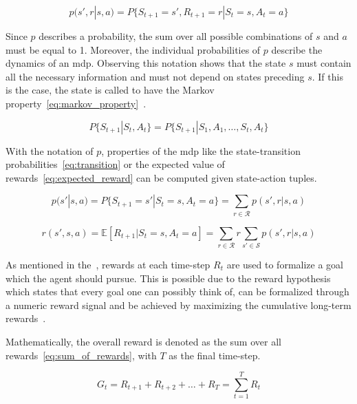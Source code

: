 \documentclass[draft,final]{vutinfth} %
\newcommand{\p}[1]{see p. #1}
\begin{document}
    \begin{equation}
        p(s',r|s,a) = P\{S_{t+1}=s', R_{t+1}=r | S_t=s, A_t=a\}\label{eq:distribution}
    \end{equation}

    Since $p$ describes a probability, the sum over all possible combinations of $s$ and $a$ must be equal to 1.
    Moreover, the individual probabilities of $p$ describe the dynamics of an \gls{mdp}.
    Observing this notation shows that the state $s$ must contain all the necessary information and must not depend on states preceding $s$.
    If this is the case, the state is called to have the Markov property~\eqref{eq:markov_property}~\citep{francois-lavet_introduction_2018}.

    \begin{equation}
        P\{S_{t+1}|S_t,A_t\} = P\{S_{t+1}|S_1,A_1,\ldots,S_t,A_t\} \label{eq:markov_property}
    \end{equation}

    With the notation of $p$, properties of the \gls{mdp} like the state-transition probabilities~\eqref{eq:transition} or the expected value of rewards~\eqref{eq:expected_reward} can be computed given state-action tuples.

    \begin{equation}
        p(s'|s,a) = P\{S_{t+1}=s'| S_t=s, A_t=a\} = \sum_{r \in \mathcal{R}} p(s',r | s,a) \label{eq:transition}
    \end{equation}

    \begin{equation}
        r(s',s,a) = \mathbb{E}[R_{t+1} | S_t=s, A_t=a] = \sum_{r\in \mathcal{R}} r \sum_{s' \in \mathcal{S}} p(s',r | s,a) \label{eq:expected_reward}
    \end{equation}

    As mentioned in the~, rewards at each time-step $R_t$ are used to formalize a goal which the agent should pursue.
    This is possible due to the reward hypothesis which states that every goal one can possibly think of, can be formalized through a numeric reward signal and be achieved by maximizing the cumulative long-term rewards~\citep[\p{53}]{sutton_reinforcement_2018}.

    Mathematically, the overall reward is denoted as the sum over all rewards~\eqref{eq:sum_of_rewards}, with $T$ as the final time-step.

    \begin{equation}
        G_t=R_{t+1} + R_{t+2}+ \ldots + R_{T}  =\sum_{t=1}^{T} R_{t}\label{eq:sum_of_rewards}
    \end{equation}
\end{document}
